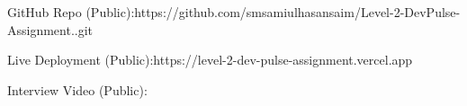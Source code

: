 GitHub Repo (Public):https://github.com/smsamiulhasansaim/Level-2-DevPulse-Assignment..git

Live Deployment (Public):https://level-2-dev-pulse-assignment.vercel.app

Interview Video (Public):